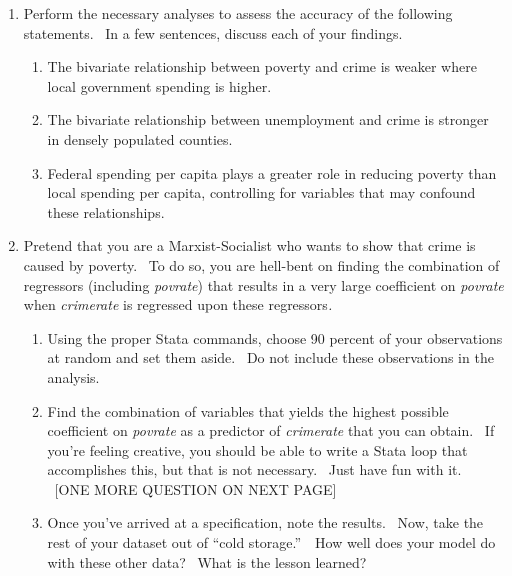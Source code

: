 \documentclass[11pt]{article}
\begin{document}
\begin{enumerate}
\item Perform the necessary analyses to assess the accuracy of the following
statements. \ In a few sentences, discuss each of your findings.

\begin{enumerate}
\item The bivariate relationship between poverty and crime is weaker where
local government spending is higher.

\item The bivariate relationship between unemployment and crime is stronger
in densely populated counties.

\item Federal spending per capita plays a greater role in reducing poverty
than local spending per capita, controlling for variables that may confound
these relationships.\bigskip
\end{enumerate}

\item Pretend that you are a Marxist-Socialist who wants to show that crime
is caused by poverty. \ To do so, you are hell-bent on finding the
combination of regressors (including \textit{povrate}) that results in a
very large coefficient on \textit{povrate} when \textit{crimerate }is
regressed upon these regressors\textit{.}

\begin{enumerate}
\item Using the proper Stata commands, choose 90 percent of your
observations at random and set them aside. \ Do not include these
observations in the analysis.

\item Find the combination of variables that yields the highest possible
coefficient on \textit{povrate }as a predictor of \textit{crimerate }that
you can obtain. \ If you're feeling creative, you should be able to write a
Stata loop that accomplishes this, but that is not necessary. \ Just have
fun with it. \ [ONE MORE QUESTION ON NEXT PAGE]

\item Once you've arrived at a specification, note the results. \ Now, take
the rest of your dataset out of \textquotedblleft cold
storage.\textquotedblright\ \ How well does your model do with these other
data? \ What is the lesson learned? \ 
\end{enumerate}
\end{enumerate}
\end{document}

